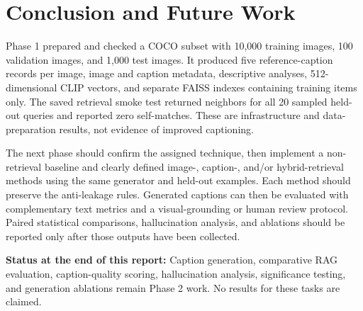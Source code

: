 \chapter{Conclusion and Future Work}
\label{ch:conclusion}

Phase 1 prepared and checked a COCO subset with 10,000 training images, 100 validation images, and 1,000 test images. It produced five reference-caption records per image, image and caption metadata, descriptive analyses, 512-dimensional CLIP vectors, and separate FAISS indexes containing training items only. The saved retrieval smoke test returned neighbors for all 20 sampled held-out queries and reported zero self-matches. These are infrastructure and data-preparation results, not evidence of improved captioning.

The next phase should confirm the assigned technique, then implement a non-retrieval baseline and clearly defined image-, caption-, and/or hybrid-retrieval methods using the same generator and held-out examples. Each method should preserve the anti-leakage rules. Generated captions can then be evaluated with complementary text metrics and a visual-grounding or human review protocol. Paired statistical comparisons, hallucination analysis, and ablations should be reported only after those outputs have been collected.

\begin{scopebox}
\textbf{Status at the end of this report:} Caption generation, comparative RAG evaluation, caption-quality scoring, hallucination analysis, significance testing, and generation ablations remain Phase 2 work. No results for these tasks are claimed.
\end{scopebox}

